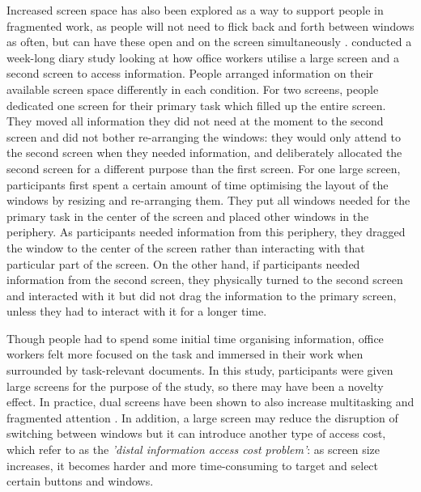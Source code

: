 Increased screen space has also been explored as a way to support people in fragmented work, as people will not need to flick back and forth between windows as often, but can have these open and on the screen simultaneously \citep{Czerwinski2003}.  \citet{Bi2009} conducted a week-long diary study looking at how office workers utilise a large screen and a second screen to access information. People arranged information on their available screen space differently in each condition. For two screens, people dedicated one screen for their primary task which filled up the entire screen. They moved all information they did not need at the moment to the second screen and did not bother re-arranging the windows: they would only attend to the second screen when they needed information, and deliberately allocated the second screen for a different purpose than the first screen. For one large screen, participants first spent a certain amount of time optimising the layout of the windows by resizing and re-arranging them. They put all windows needed for the primary task in the center of the screen and placed other windows in the periphery.  As participants needed information from this periphery, they dragged the window to the center of the screen rather than interacting with that particular part of the screen. On the other hand, if participants needed information from the second screen, they physically turned to the second screen and interacted with it but did not drag the information to the primary screen, unless they had to interact with it for a longer time.

Though people had to spend some initial time organising information, office workers felt more focused on the task and immersed in their work when surrounded by task-relevant documents. In this study, participants were given large screens for the purpose of the study, so there may have been a novelty effect. In practice, dual screens have been shown to also increase multitasking and fragmented attention \citep{Robertson2005}. In addition, a large screen may reduce the disruption of switching between windows but it can introduce another type of access cost, which \citet{Robertson2005} refer to as the \textit{'distal information access cost problem'}: as screen size increases, it becomes harder and more time-consuming to target and select certain buttons and windows. 

